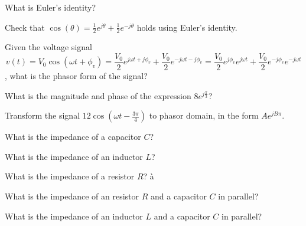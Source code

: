 
\begin{enumerate}


\qitem What is Euler's identity?


\qitem Check that $\cos(\theta)=\frac{1}{2}e^{j\theta}+\frac{1}{2}e^{-j\theta}$ holds using Euler's identity.


\qitem Given the voltage signal \begin{equation}
v(t) = V_0 \cos(\omega t + \phi_v)=\frac{V_0}{2}e^{j\omega t+j\phi_v}+\frac{V_0}{2}e^{-j\omega t-j\phi_v}=\frac{V_0}{2}e^{j\phi_v}e^{j\omega t}+\frac{V_0}{2}e^{-j\phi_v}e^{-j\omega t} \end{equation}, what is the phasor form of the signal?


\qitem What is the magnitude and phase of the expression $8 e^{j \frac{\pi}{3}}$?



\qitem Transform the signal $12 \cos(\omega t - \frac{3\pi}{4})$ to phasor domain, in the form $A e^{jB\pi}$.



\qitem What is the impedance of a capacitor $C$?



\qitem What is the impedance of an inductor $L$?


\qitem What is the impedance of a resistor $R$?
à


\qitem What is the impedance of an resistor $R$ and a capacitor $C$ in parallel?

\qitem What is the impedance of an inductor $L$ and a capacitor $C$ in parallel?




\end{enumerate}